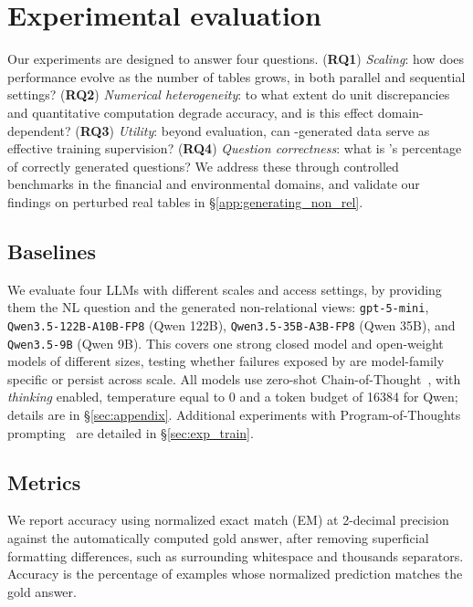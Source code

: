 \section{Experimental evaluation}

Our experiments are designed to answer four questions. (\textbf{RQ1}) \emph{Scaling}: how does performance evolve as the number of tables grows, in both parallel and sequential settings? (\textbf{RQ2}) \emph{Numerical heterogeneity}: to what extent do unit discrepancies and quantitative computation degrade accuracy, and is this effect domain-dependent? (\textbf{RQ3}) \emph{Utility}: beyond evaluation, can \name{}-generated data serve as effective training supervision? (\textbf{RQ4}) \emph{Question correctness}: what is \name{}'s percentage of correctly generated questions?
We address these through controlled benchmarks in the financial and environmental domains, and validate our findings on perturbed real tables in \S\ref{app:generating_non_rel}.

\subsection{Baselines}

We evaluate four LLMs with different scales and access settings, by providing them the NL question and the generated non-relational views:
\texttt{gpt-5-mini}, \texttt{Qwen3.5-122B-A10B-FP8} (Qwen 122B),
\texttt{Qwen3.5-35B-A3B-FP8} (Qwen 35B), and \texttt{Qwen3.5-9B} (Qwen 9B).
This covers one strong closed model and open-weight models of different sizes, testing whether failures exposed by \name are model-family specific or persist across scale.
All models use zero-shot Chain-of-Thought~\cite{cot}, with \emph{thinking} enabled, temperature equal to 0 and a token budget of 16384 for Qwen; details are in \S\ref{sec:appendix}. Additional experiments with Program-of-Thoughts prompting~\cite{pot} are detailed in \S\ref{sec:exp_train}.

\subsection{Metrics}
\label{sec:metrics}

We report accuracy using normalized exact match (EM) at 2-decimal precision against the automatically computed gold answer, after removing superficial formatting differences, such as surrounding whitespace and thousands separators. Accuracy is the percentage of examples whose normalized prediction matches the gold answer.

